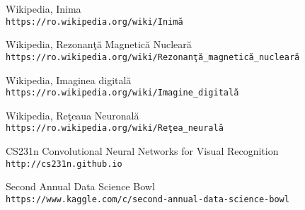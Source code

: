 \begin{thebibliography}{9} 

Wikipedia, Inima
\\\texttt{https://ro.wikipedia.org/wiki/Inim\u{a}}

Wikipedia, Rezonan\c{t}\u{a} Magnetic\u{a} Nuclear\u{a}
\\\texttt{https://ro.wikipedia.org/wiki/Rezonan\c{t}\u{a}\_magnetic\u{a}\_nuclear\u{a}}

Wikipedia, Imaginea digital\u{a}
\\\texttt{https://ro.wikipedia.org/wiki/Imagine\_digital\u{a}}

Wikipedia, Re\c{t}eaua Neuronal\u{a}
\\\texttt{https://ro.wikipedia.org/wiki/Re\c{t}ea\_neural\u{a}}

CS231n Convolutional Neural Networks for Visual Recognition
\\\texttt{http://cs231n.github.io}

Second Annual Data Science Bowl
\\\texttt{https://www.kaggle.com/c/second-annual-data-science-bowl}

\end{thebibliography}